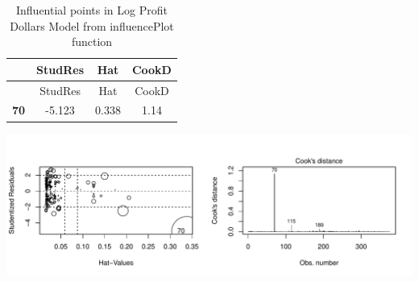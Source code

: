 \documentclass[]{elsarticle} %
\makeatletter
\def\maxwidth{\ifdim\Gin@nat@width>\linewidth\linewidth
\else\Gin@nat@width\fi}
\let\Oldincludegraphics\includegraphics
\renewcommand{\includegraphics}[1]{\Oldincludegraphics[width=\maxwidth]{#1}}
\makeatother
\begin{document}
\begin{longtable}[]{@{}cccc@{}}
\caption{Influential points in Log Profit Dollars Model from
influencePlot function}\tabularnewline
\toprule
\begin{minipage}[b]{0.11\columnwidth}\centering\strut
~\strut
\end{minipage} & \begin{minipage}[b]{0.12\columnwidth}\centering\strut
StudRes\strut
\end{minipage} & \begin{minipage}[b]{0.07\columnwidth}\centering\strut
Hat\strut
\end{minipage} & \begin{minipage}[b]{0.09\columnwidth}\centering\strut
CookD\strut
\end{minipage}\tabularnewline
\midrule
\endfirsthead
\toprule
\begin{minipage}[b]{0.11\columnwidth}\centering\strut
~\strut
\end{minipage} & \begin{minipage}[b]{0.12\columnwidth}\centering\strut
StudRes\strut
\end{minipage} & \begin{minipage}[b]{0.07\columnwidth}\centering\strut
Hat\strut
\end{minipage} & \begin{minipage}[b]{0.09\columnwidth}\centering\strut
CookD\strut
\end{minipage}\tabularnewline
\midrule
\endhead
\begin{minipage}[t]{0.11\columnwidth}\centering\strut
\textbf{70}\strut
\end{minipage} & \begin{minipage}[t]{0.12\columnwidth}\centering\strut
-5.123\strut
\end{minipage} & \begin{minipage}[t]{0.07\columnwidth}\centering\strut
0.338\strut
\end{minipage} & \begin{minipage}[t]{0.09\columnwidth}\centering\strut
1.14\strut
\end{minipage}\tabularnewline
\bottomrule
\end{longtable}

\includegraphics{Final_Project_files/figure-latex/unnamed-chunk-21-1.pdf}
\end{document}
